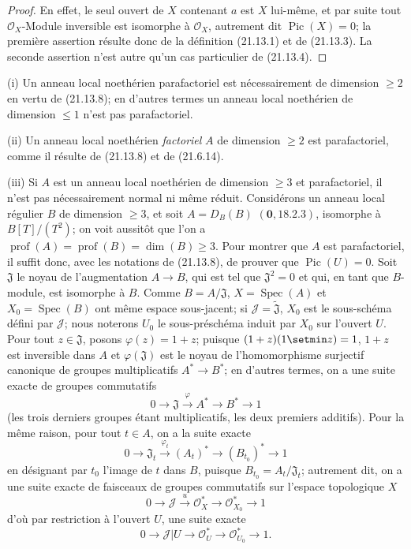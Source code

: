 \begin{proof}
En effet, le seul ouvert de $X$ contenant $a$ est $X$ lui-même, et par suite tout
$\mathcal O_X$-Module inversible est isomorphe à $\mathcal O_X$, autrement dit
$\operatorname{Pic}(X)=0$; la première assertion résulte donc de la définition
(21.13.1) et de (21.13.3). La seconde assertion n'est autre qu'un cas particulier de
(21.13.4).
\end{proof}

\begin{examples}[21.13.9]
\label{IV.21.13.9}
(i) Un anneau local noethérien parafactoriel est nécessairement de dimension
$\geq2$ en vertu de (21.13.8); en d'autres termes un anneau local noethérien de
dimension $\leq1$ n'est pas parafactoriel.

(ii) Un anneau local noethérien \emph{factoriel} $A$ de dimension $\geq2$ est
parafactoriel, comme il résulte de (21.13.8) et de (21.6.14).

(iii) Si $A$ est un anneau local noethérien de dimension $\geq3$ et parafactoriel, il
n'est pas nécessairement normal ni même réduit. Considérons un anneau local régulier
$B$ de dimension $\geq3$, et soit $A=D_B(B)$ $(\mathbf 0, 18.2.3)$, isomorphe à
$B[T]/(T^2)$; on voit aussitôt que l'on a
$\operatorname{prof}(A)=\operatorname{prof}(B)=\dim(B)\geq3$. Pour montrer que $A$
est parafactoriel, il suffit donc, avec les notations de (21.13.8), de prouver que
$\operatorname{Pic}(U)=0$. Soit $\mathfrak J$ le noyau de l'augmentation $A\to B$,
qui est tel que $\mathfrak J^2=0$ et qui, en tant que $B$-module, est isomorphe à $B$.
Comme $B=A/\mathfrak J$, $X=\operatorname{Spec}(A)$ et
$X_0=\operatorname{Spec}(B)$ ont même espace sous-jacent; si
$\mathscr J=\widetilde{\mathfrak J}$, $X_0$ est le sous-schéma défini par
$\mathscr J$; nous noterons $U_0$ le sous-préschéma induit par $X_0$ sur l'ouvert
$U$. Pour tout $z\in\mathfrak J$, posons $\varphi(z)=1+z$; puisque
$(1+z)(1\setmin z)=1$, $1+z$ est inversible dans $A$ et $\varphi(\mathfrak J)$ est le noyau
de l'homomorphisme surjectif canonique de groupes multiplicatifs $A^*\to B^*$; en
d'autres termes, on a une suite exacte de groupes commutatifs
\[
  0\longrightarrow\mathfrak J\xrightarrow{\varphi}A^*\longrightarrow B^*
  \longrightarrow1
\]
(les trois derniers groupes étant multiplicatifs, les deux premiers additifs). Pour la
même raison, pour tout $t\in A$, on a la suite exacte
\[
  0\longrightarrow\mathfrak J_t\xrightarrow{\varphi_t}(A_t)^*
  \longrightarrow(B_{t_0})^*\longrightarrow1
\]
en désignant par $t_0$ l'image de $t$ dans $B$, puisque
$B_{t_0}=A_t/\mathfrak J_t$; autrement dit, on a une suite exacte de faisceaux de
groupes commutatifs sur l'espace topologique $X$
\[
  0\longrightarrow\mathscr J\xrightarrow{u}\mathcal O_X^*
  \longrightarrow\mathcal O_{X_0}^*\longrightarrow1
\]
d'où par restriction à l'ouvert $U$, une suite exacte
\[
  0\longrightarrow\mathscr J|U\longrightarrow\mathcal O_U^*
  \longrightarrow\mathcal O_{U_0}^*\longrightarrow1.
\]


\end{examples}
